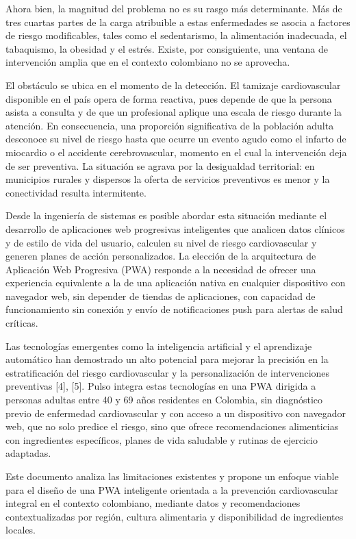 \documentclass[conference]{IEEEtran}
\begin{document}
Ahora bien, la magnitud del problema no es su rasgo más determinante. Más de tres cuartas partes de la carga atribuible a estas enfermedades se asocia a factores de riesgo modificables, tales como el sedentarismo, la alimentación inadecuada, el tabaquismo, la obesidad y el estrés. Existe, por consiguiente, una ventana de intervención amplia que en el contexto colombiano no se aprovecha.

El obstáculo se ubica en el momento de la detección. El tamizaje cardiovascular disponible en el país opera de forma reactiva, pues depende de que la persona asista a consulta y de que un profesional aplique una escala de riesgo durante la atención. En consecuencia, una proporción significativa de la población adulta desconoce su nivel de riesgo hasta que ocurre un evento agudo como el infarto de miocardio o el accidente cerebrovascular, momento en el cual la intervención deja de ser preventiva. La situación se agrava por la desigualdad territorial: en municipios rurales y dispersos la oferta de servicios preventivos es menor y la conectividad resulta intermitente.

Desde la ingeniería de sistemas es posible abordar esta situación mediante el desarrollo de aplicaciones web progresivas inteligentes que analicen datos clínicos y de estilo de vida del usuario, calculen su nivel de riesgo cardiovascular y generen planes de acción personalizados. La elección de la arquitectura de Aplicación Web Progresiva (PWA) responde a la necesidad de ofrecer una experiencia equivalente a la de una aplicación nativa en cualquier dispositivo con navegador web, sin depender de tiendas de aplicaciones, con capacidad de funcionamiento sin conexión y envío de notificaciones push para alertas de salud críticas.

Las tecnologías emergentes como la inteligencia artificial y el aprendizaje automático han demostrado un alto potencial para mejorar la precisión en la estratificación del riesgo cardiovascular y la personalización de intervenciones preventivas [4], [5]. Pulso integra estas tecnologías en una PWA dirigida a personas adultas entre 40 y 69 años residentes en Colombia, sin diagnóstico previo de enfermedad cardiovascular y con acceso a un dispositivo con navegador web, que no solo predice el riesgo, sino que ofrece recomendaciones alimenticias con ingredientes específicos, planes de vida saludable y rutinas de ejercicio adaptadas.

Este documento analiza las limitaciones existentes y propone un enfoque viable para el diseño de una PWA inteligente orientada a la prevención cardiovascular integral en el contexto colombiano, mediante datos y recomendaciones contextualizadas por región, cultura alimentaria y disponibilidad de ingredientes locales.
\end{document}
